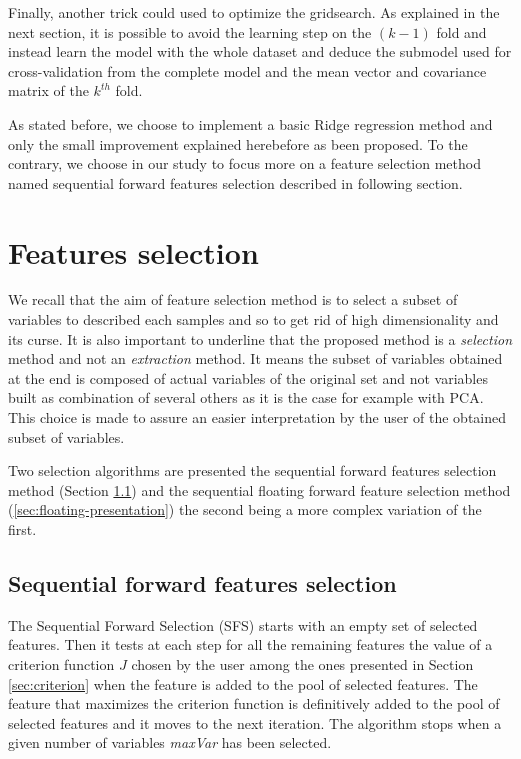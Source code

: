 \documentclass[a4paper,11pt,DIV=16]{scrartcl}
\begin{document}
    Finally, another trick could used to optimize the gridsearch. As explained in the next section, it is possible to avoid the learning step on the $(k-1)$ fold and instead learn the model with the whole dataset and deduce the submodel used for cross-validation from the complete model and the mean vector and covariance matrix of the $k^{th}$ fold.

    As stated before, we choose to implement a basic Ridge regression method and only the small improvement explained herebefore as been proposed. To the contrary, we choose in our study to focus more on a feature selection method named sequential forward features selection described in following section.

\section{Features selection}

We recall that the aim of feature selection method is to select a subset of variables to described each samples and so to get rid of high dimensionality and its curse. It is also important to underline that the proposed method is a \emph{selection} method and not an \emph{extraction} method. It means the subset of variables obtained at the end is composed of actual variables of the original set and not variables built as combination of several others as it is the case for example with PCA. This choice is made to assure an easier interpretation by the user of the obtained subset of variables.

Two selection algorithms are presented the sequential forward features selection method (Section \ref{sec:forward-presentation}) and the sequential floating forward feature selection method (\ref{sec:floating-presentation}) the second being a more complex variation of the first.

    \subsection{Sequential forward features selection}
    \label{sec:forward-presentation}

    The Sequential Forward Selection (SFS) starts with an empty set of selected features. Then it tests at each step for all the remaining features the value of a criterion function $J$ chosen by the user among the ones presented in Section \ref{sec:criterion} when the feature is added to the pool of selected features. The feature that maximizes the criterion function is definitively added to the pool of selected features and it moves to the next iteration. The algorithm stops when a given number of variables \emph{maxVar} has been selected.
\end{document}

